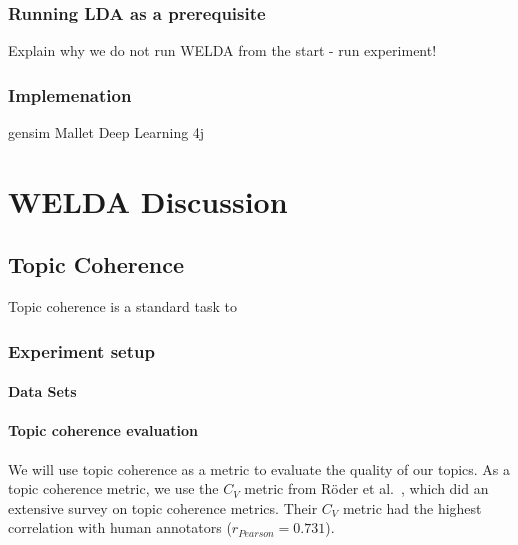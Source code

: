 \documentclass[
        a4paper,
        titlepage,
        twoside,
        parskip
        ]{scrbook}
\theoremstyle{break}
\begin{document}
\subsection{Running LDA as a prerequisite}
Explain why we do not run WELDA from the start - run experiment!

\subsection{Implemenation}

gensim
Mallet
Deep Learning 4j

\chapter{WELDA Discussion}


\section{Topic Coherence}
Topic coherence is a standard task to
\subsection{Experiment setup}
\subsubsection{Data Sets}
\subsubsection{Topic coherence evaluation}

We will use topic coherence as a metric to evaluate the quality of our topics.
As a topic coherence metric, we use the $C_V$ metric from Röder et al.~\cite{Roder2015}, which did an extensive survey on topic coherence metrics.
Their $C_V$ metric had the highest correlation with human annotators ($r_{Pearson} = 0.731$).
\end{document}
